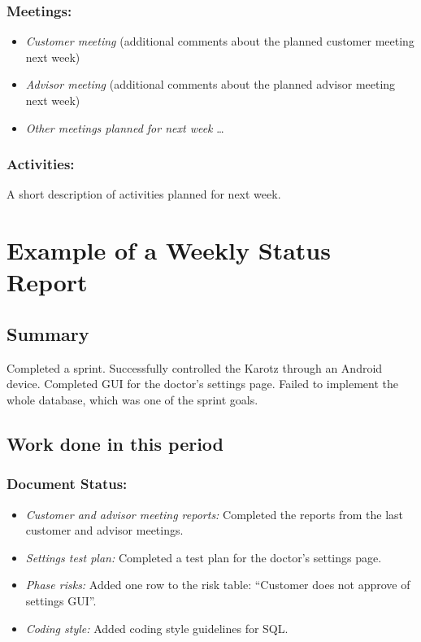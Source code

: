 \subsection*{Meetings:}
\begin{itemize}
\item \emph{Customer meeting} (additional comments about the planned customer meeting next week)
\item \emph{Advisor meeting} (additional comments about the planned advisor meeting next week)
\item \emph{Other meetings planned for next week} \ldots
\end{itemize}

\subsection*{Activities:} A short description of activities planned for next week.

\chapter{Example of a Weekly Status Report}
\section*{Summary}
Completed a sprint. Successfully controlled the Karotz through an Android device. Completed GUI for the doctor's settings page. Failed to implement the whole database, which was one of the sprint goals.

\section*{Work done in this period}
\subsection*{Document Status:}
\begin{itemize}
\item \emph{Customer and advisor meeting reports:} Completed the reports from the last customer and advisor meetings.
\item \emph{Settings test plan:} Completed a test plan for the doctor's settings page.
\item \emph{Phase risks:} Added one row to the risk table: ``Customer does not approve of settings GUI''.
\item \emph{Coding style:} Added coding style guidelines for SQL.
\end{itemize}

